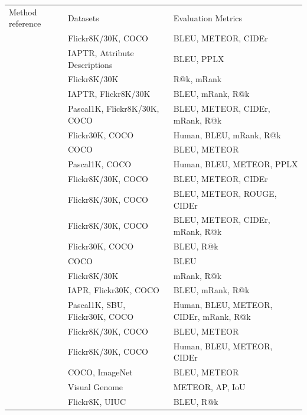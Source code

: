 \begin{table}[hpt]
    \caption{Summary of neural methods, datasets and evaluation metrics}
    \label{tab:nn-methods-datasets-metrics}
    \begin{longtable}{p{50mm} | p{50mm} | p{60mm} }
        Method reference &  Datasets & Evaluation Metrics \\
        \citet{Karpathy2014} & Flickr8K/30K, COCO & BLEU, METEOR, CIDEr \\
        \citet{Kiros2014a} & IAPTR, Attribute Descriptions & BLEU, PPLX \\
        \citet{Kiros2014b} & Flickr8K/30K & R@k, mRank \\
        \citet{Mao2014} & IAPTR, Flickr8K/30K & BLEU, mRank, R@k \\
        \citet{Chen2015} & Pascal1K, Flickr8K/30K, COCO & BLEU, METEOR, CIDEr, mRank, R@k \\
        \citet{Donahue2015} & Flickr30K, COCO & Human, BLEU, mRank, R@k \\
        \citet{Devlin2015} & COCO & BLEU, METEOR \\
        \citet{Fang2015} & Pascal1K, COCO & Human, BLEU, METEOR, PPLX \\
        \citet{Jia2015} & Flickr8K/30K, COCO & BLEU, METEOR, CIDEr \\
        \citet{Jin2015} & Flickr8K/30K, COCO & BLEU, METEOR, ROUGE, CIDEr \\
        \citet{Karpathy2015} & Flickr8K/30K, COCO & BLEU, METEOR, CIDEr, mRank, R@k \\
        \citet{Lebret2015a} & Flickr30K, COCO & BLEU, R@k \\
        \citet{Lebret2015b} & COCO & BLEU \\
        \citet{Ma2015} & Flickr8K/30K & mRank, R@k \\
        \citet{Mao2015a} & IAPR, Flickr30K, COCO & BLEU, mRank, R@k \\
        \citet{Vinyals2015} & Pascal1K, SBU, Flickr30K, COCO & Human, BLEU, METEOR, CIDEr, mRank, R@k \\
        \citet{Xu2015} & Flickr8K/30K, COCO & BLEU, METEOR \\
        \citet{Yagcioglu2015} & Flickr8K/30K, COCO & Human, BLEU, METEOR, CIDEr \\
        \citet{Hendricks2016} & COCO, ImageNet & BLEU, METEOR \\
        \citet{Johnson2016} & Visual Genome & METEOR, AP, IoU \\
        \citet{Ma2016} & Flickr8K, UIUC & BLEU, R@k \\

\end{longtable}
\end{table}
